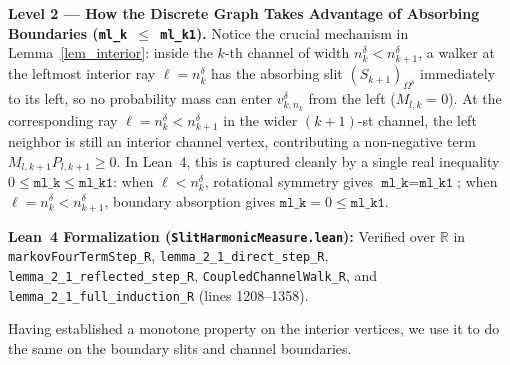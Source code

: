 \documentclass[11pt,reqno]{amsart}
\numberwithin{equation}{section}
\newcommand{\R}{\mathbb{R}}
\begin{document}
\begin{leveltwo}
\noindent\textbf{\textcolor{l2border}{Level 2 --- How the Discrete Graph Takes Advantage of Absorbing Boundaries (\texttt{ml\_k $\le$ ml\_k1}).}}
Notice the crucial mechanism in Lemma~\ref{lem_interior}: inside the $k$-th channel of width $n_k^{\delta} < n_{k+1}^{\delta}$, a walker at the leftmost interior ray $\ell = n_k^{\delta}$ has the absorbing slit $(S_{k+1})_{\Omega^{\delta}}$ immediately to its left, so no probability mass can enter $v_{k,n_k}^{\delta}$ from the left ($M_{l,k} = 0$). At the corresponding ray $\ell = n_k^{\delta} < n_{k+1}^{\delta}$ in the wider $(k+1)$-st channel, the left neighbor is still an interior channel vertex, contributing a non-negative term $M_{l,k+1} P_{l,k+1} \ge 0$. In Lean~4, this is captured cleanly by a single real inequality $0 \le \texttt{ml\_k} \le \texttt{ml\_k1}$: when $\ell < n_k^{\delta}$, rotational symmetry gives $\texttt{ml\_k} = \texttt{ml\_k1}$; when $\ell = n_k^{\delta} < n_{k+1}^{\delta}$, boundary absorption gives $\texttt{ml\_k} = 0 \le \texttt{ml\_k1}$.

\smallskip
\noindent\textbf{\textcolor{leannote}{Lean~4 Formalization (\texttt{SlitHarmonicMeasure.lean}):}} Verified over $\R$ in \texttt{markovFourTermStep\_R}, \texttt{lemma\_2\_1\_direct\_step\_R}, \texttt{lemma\_2\_1\_reflected\_step\_R}, \texttt{CoupledChannelWalk\_R}, and \texttt{lemma\_2\_1\_full\_induction\_R} (lines 1208--1358).
\end{leveltwo}

Having established a monotone property on the interior vertices, we use it to do the same on the boundary slits and channel boundaries.
\end{document}
